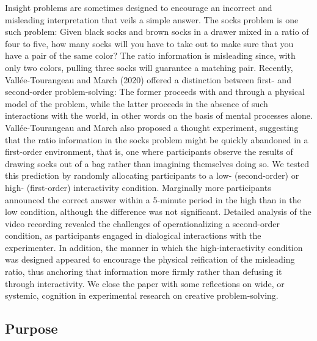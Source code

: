 Insight problems are sometimes designed to encourage an incorrect and
misleading interpretation that veils a simple answer. The socks problem
is one such problem: Given black socks and brown socks in a drawer mixed
in a ratio of four to five, how many socks will you have to take out to
make sure that you have a pair of the same color? The ratio information
is misleading since, with only two colors, pulling three socks will
guarantee a matching pair. Recently, Vallée-Tourangeau and March (2020)
offered a distinction between first- and second-order problem-solving:
The former proceeds with and through a physical model of the problem,
while the latter proceeds in the absence of such interactions with the
world, in other words on the basis of mental processes alone.
Vallée-Tourangeau and March also proposed a thought experiment,
suggesting that the ratio information in the socks problem might be
quickly abandoned in a first-order environment, that is, one where
participants observe the results of drawing socks out of a bag rather
than imagining themselves doing so. We tested this prediction by
randomly allocating participants to a low- (second-order) or high-
(first-order) interactivity condition. Marginally more participants
announced the correct answer within a 5-minute period in the high than
in the low condition, although the difference was not significant.
Detailed analysis of the video recording revealed the challenges of
operationalizing a second-order condition, as participants engaged in
dialogical interactions with the experimenter. In addition, the manner
in which the high-interactivity condition was designed appeared to
encourage the physical reification of the misleading ratio, thus
anchoring that information more firmly rather than defusing it through
interactivity. We close the paper with some reflections on wide, or
systemic, cognition in experimental research on creative
problem-solving.

\hypertarget{purpose}{%
\subsection{\texorpdfstring{Purpose }{Purpose }}\label{purpose}}


